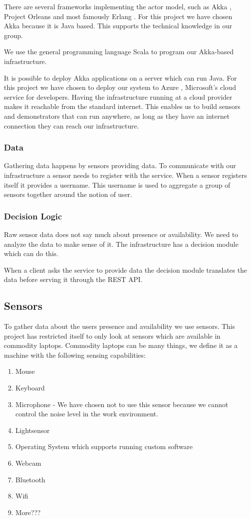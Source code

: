 \documentclass{sigchi}
\begin{document}
There are several frameworks implementing the actor model, such as Akka \cite{akka}, Project Orleans \cite{orleans} and most famously Erlang \cite{erlang}.
For this project we have chosen Akka because it is Java based.
This supports the technical knowledge in our group.

We use the general programming language Scala \cite{scala} to program our Akka-based infrastructure.

It is possible to deploy Akka applications on a server which can run Java.
For this project we have chosen to deploy our system to Azure \cite{azure}, Microsoft's cloud service for developers.
Having the infrastructure running at a cloud provider makes it reachable from the standard internet.
This enables us to build sensors and demonstrators that can run anywhere, as long as they have an internet connection they can reach our infrastructure.

\subsubsection{Data}
Gathering data happens by sensors providing data.
To communicate with our infrastructure a sensor needs to register with the service.
When a sensor registers itself it provides a username.
This username is used to aggregate a group of sensors together around the notion of user.

\subsubsection{Decision Logic}
Raw sensor data does not say much about presence or availability.
We need to analyze the data to make sense of it.
The infrastructure has a decision module which can do this.

When a client asks the service to provide data the decision module translates the data before serving it through the REST API.

\subsection{Sensors}
To gather data about the users presence and availability we use sensors.
This project has restricted itself to only look at sensors which are available in commodity laptops.
Commodity laptops can be many things, we define it as a machine with the following sensing capabilities:
\begin{enumerate}
  \item Mouse
  \item Keyboard
  \item Microphone - We have chosen not to use this sensor because we cannot control the noise level in the work environment.
  \item Lightsensor
  \item Operating System which supports running custom software
  \item Webcam
  \item Bluetooth
  \item Wifi
  \item More???
\end{enumerate}
\end{document}

